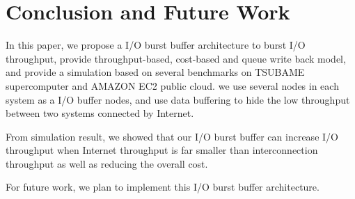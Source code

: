 \section{Conclusion and Future Work}

In this paper, we propose a I/O burst buffer architecture to burst I/O throughput, provide throughput-based, cost-based and queue write back model, and provide a simulation based on several benchmarks on TSUBAME supercomputer and AMAZON EC2 public cloud.
we use several nodes in each system as a I/O buffer nodes, and use data buffering to hide the low throughput between two systems connected by Internet.

From simulation result, we showed that our I/O burst buffer can increase I/O throughput when Internet throughput is far smaller than interconnection throughput as well as reducing the overall cost.

For future work, we plan to implement this I/O burst buffer architecture.